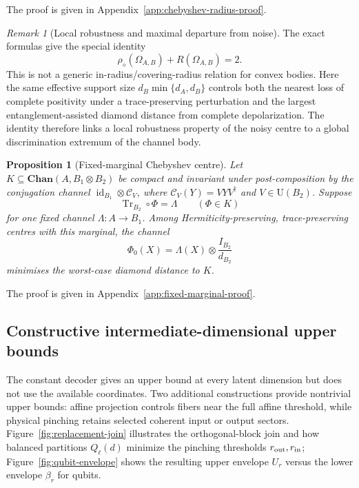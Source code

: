 \documentclass[11pt,a4paper]{article}
\theoremstyle{definition}
\theoremstyle{plain}
\newtheorem{proposition}[theorem]{Proposition}
\theoremstyle{remark}
\newtheorem{remark}[theorem]{Remark}
\DeclareMathOperator{\Tr}{Tr}
\newcommand{\Chan}{\mathbf{Chan}}
\begin{document}
The proof is given in Appendix~\ref{app:chebyshev-radius-proof}.

\begin{remark}[Local robustness and maximal departure from noise]
The exact formulas give the special identity
\[
\rho_\diamond(\Omega_{A,B})+R(\Omega_{A,B})=2.
\]
This is not a generic in-radius/covering-radius relation for convex bodies.
Here the same effective support size
$d_B\min\{d_A,d_B\}$ controls both the nearest loss of complete positivity
under a trace-preserving perturbation and the largest entanglement-assisted
diamond distance from complete depolarization. The identity therefore links
a local robustness property of the noisy centre to a global discrimination
extremum of the channel body.
\end{remark}

\begin{proposition}[Fixed-marginal Chebyshev centre]
\label{prop:fixed-marginal-chebyshev}
Let $K\subseteq\Chan(A,B_1\otimes B_2)$ be compact and invariant under
post-composition by the conjugation channel
$\operatorname{id}_{B_1}\otimes\mathcal C_V$, where
$\mathcal C_V(Y)=VYV^\dagger$ and $V\in\mathrm U(B_2)$. Suppose
\[
\Tr_{B_2}\circ\Phi=\Lambda
\qquad(\Phi\in K)
\]
for one fixed channel $\Lambda:A\to B_1$. Among Hermiticity-preserving,
trace-preserving centres with this marginal, the channel
\[
\Phi_0(X)=\Lambda(X)\otimes\frac{I_{B_2}}{d_{B_2}}
\]
minimises the worst-case diamond distance to $K$.
\end{proposition}

The proof is given in Appendix~\ref{app:fixed-marginal-proof}.

\subsection{Constructive intermediate-dimensional upper bounds}

The constant decoder gives an upper bound at every latent dimension but does
not use the available coordinates. Two additional constructions provide
nontrivial upper bounds: affine projection controls fibers near the full
affine threshold, while physical pinching retains selected coherent input or
output sectors. Figure~\ref{fig:replacement-join} illustrates the orthogonal-block join and how balanced partitions $Q_\ell(d)$ minimize the pinching thresholds $r_{\rm out},r_{\rm in}$; Figure~\ref{fig:qubit-envelope} shows the resulting upper envelope $U_r$ versus the lower envelope $\beta_r$ for qubits.
\end{document}
